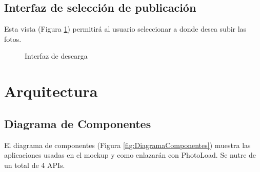\documentclass{scrartcl}
\begin{document}
\subsection{Interfaz de selección de publicación}
Esta vista (Figura \ref{fig:VistaDescarga}) permitirá al usuario seleccionar a donde desea subir las fotos.

\begin{figure}[H]
	
	\centering
	\caption{Interfaz de descarga}
	\label{fig:VistaDescarga}
	
\end{figure}
\section{Arquitectura}

\subsection{Diagrama de Componentes}
El diagrama de componentes (Figura \ref{fig:DiagramaComponentes}) muestra las aplicaciones usadas en el mockup y como enlazarán con PhotoLoad. Se nutre de un total de 4 APIs.
\end{document}
